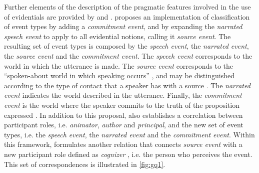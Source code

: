 \documentclass[output=paper]{langsci/langscibook}
\begin{document}
Further elements of the description of the pragmatic features involved in the use of evidentials are provided by \citet{Kockelman2004} and \citet{Bergqvist2018c}. \citet{Kockelman2004} proposes an implementation of  classification of event types by adding a \textit{commitment event}, and by expanding the \textit{narrated speech event} to apply to all evidential notions, calling it \textit{source event}. The resulting set of event types is composed by the \textit{speech event}, the \textit{narrated event}, the \textit{source event} and the \textit{commitment event}. The \textit{speech event} corresponds to the world in which the utterance is made. The \textit{source event} corresponds to the “spoken-about world in which speaking occurs” \citep[128]{Kockelman2004}, and may be distinguished according to the type of contact that a speaker has with a source \citep[143]{Kockelman2004}. The \textit{narrated event} indicates the world described in the utterance. Finally, the \textit{commitment event} is the world where the speaker commits to the truth of the proposition expressed \citep[127]{Kockelman2004}. In addition to this proposal, \citet{Kockelman2004} also establishes a correlation between  participant roles, i.e. \textit{animator}, \textit{author} and \textit{principal}, and the new set of event types, i.e. the \textit{speech event}, the \textit{narrated event} and the \textit{commitment event}. Within this framework, \citet{Bergqvist2018c} formulates another relation that connects \textit{source event} \citep[128]{Kockelman2004} with a new participant role defined as \textit{cognizer} \citep[22]{Bergqvist2018c}, i.e. the person who perceives the event. This set of correspondences is illustrated in \ref{fig:gq1}.

\end{document}
